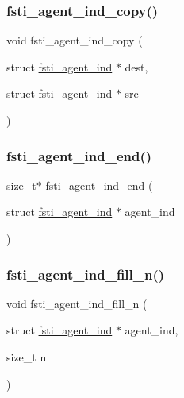 \mbox{\label{fsti-agent_8h_a6681f5dfe9ce93defe0d395774010080}} 
\subsubsection{\texorpdfstring{fsti\+\_\+agent\+\_\+ind\+\_\+copy()}{fsti\_agent\_ind\_copy()}}
{\footnotesize\ttfamily void fsti\+\_\+agent\+\_\+ind\+\_\+copy (\begin{DoxyParamCaption}\item[{struct \mbox{\hyperlink{structfsti__agent__ind}{fsti\+\_\+agent\+\_\+ind}} $\ast$}]{dest,  }\item[{struct \mbox{\hyperlink{structfsti__agent__ind}{fsti\+\_\+agent\+\_\+ind}} $\ast$}]{src }\end{DoxyParamCaption})}

\mbox{\label{fsti-agent_8h_a0a007fca1a85b26dc9f890b5c9f5649a}} 
\subsubsection{\texorpdfstring{fsti\+\_\+agent\+\_\+ind\+\_\+end()}{fsti\_agent\_ind\_end()}}
{\footnotesize\ttfamily size\+\_\+t$\ast$ fsti\+\_\+agent\+\_\+ind\+\_\+end (\begin{DoxyParamCaption}\item[{struct \mbox{\hyperlink{structfsti__agent__ind}{fsti\+\_\+agent\+\_\+ind}} $\ast$}]{agent\+\_\+ind }\end{DoxyParamCaption})}

\mbox{\label{fsti-agent_8h_ad710a67a71582f5e8a63490c1afe3a3c}} 
\subsubsection{\texorpdfstring{fsti\+\_\+agent\+\_\+ind\+\_\+fill\+\_\+n()}{fsti\_agent\_ind\_fill\_n()}}
{\footnotesize\ttfamily void fsti\+\_\+agent\+\_\+ind\+\_\+fill\+\_\+n (\begin{DoxyParamCaption}\item[{struct \mbox{\hyperlink{structfsti__agent__ind}{fsti\+\_\+agent\+\_\+ind}} $\ast$}]{agent\+\_\+ind,  }\item[{size\+\_\+t}]{n }\end{DoxyParamCaption})}

